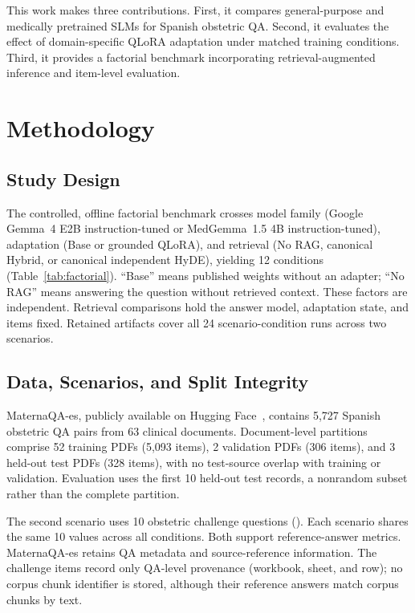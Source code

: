 This work makes three contributions. First, it compares general-purpose and
medically pretrained SLMs for Spanish obstetric QA. Second, it evaluates
the effect of domain-specific QLoRA adaptation under matched training
conditions. Third, it provides a factorial benchmark incorporating
retrieval-augmented inference and item-level evaluation.

\section{Methodology}
\subsection{Study Design}
The controlled, offline factorial benchmark crosses model family (Google
Gemma~4 E2B instruction-tuned or MedGemma~1.5 4B instruction-tuned),
adaptation (Base or grounded QLoRA), and retrieval (No RAG, canonical Hybrid,
or canonical independent HyDE), yielding 12 conditions (Table~\ref{tab:factorial}).
``Base'' means published weights without an adapter; ``No RAG'' means
answering the question without retrieved context. These factors are independent.
Retrieval comparisons hold the answer model, adaptation state, and items fixed.
Retained artifacts cover all 24 scenario-condition runs across two scenarios.

\subsection{Data, Scenarios, and Split Integrity}
MaternaQA-es, publicly available on Hugging Face~\cite{maternaqa2026}, contains
5,727 Spanish obstetric QA pairs from 63 clinical documents. Document-level
partitions comprise 52 training PDFs (5,093 items), 2 validation PDFs
(306 items), and 3 held-out test PDFs (328 items), with no test-source overlap
with training or validation. Evaluation uses the first 10 held-out test records,
a nonrandom subset rather than the complete partition.

The second scenario uses 10 obstetric challenge questions
(). Each scenario shares the same 10
 values across all conditions. Both support reference-answer
metrics. MaternaQA-es retains QA metadata and source-reference information. The
challenge items record only QA-level provenance (workbook, sheet, and row);
no corpus chunk identifier is stored, although their reference answers match
corpus chunks by text.

